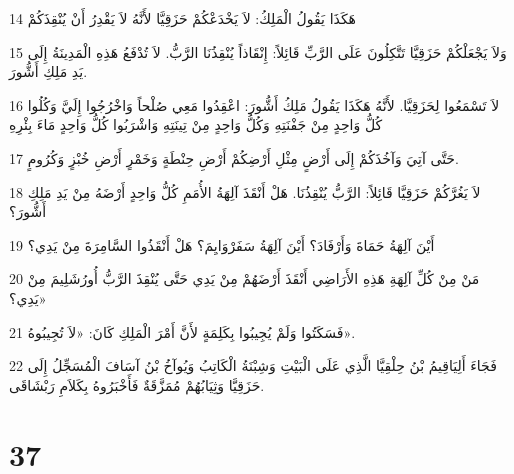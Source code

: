 \par 14 هَكَذَا يَقُولُ الْمَلِكُ: لاَ يَخْدَعْكُمْ حَزَقِيَّا لأَنَّهُ لاَ يَقْدِرُ أَنْ يُنْقِذَكُمْ
\par 15 وَلاَ يَجْعَلْكُمْ حَزَقِيَّا تَتَّكِلُونَ عَلَى الرَّبِّ قَائِلاً: إِنْقَاذاً يُنْقِذُنَا الرَّبُّ. لاَ تُدْفَعُ هَذِهِ الْمَدِينَةُ إِلَى يَدِ مَلِكِ أَشُّورَ.
\par 16 لاَ تَسْمَعُوا لِحَزَقِيَّا. لأَنَّهُ هَكَذَا يَقُولُ مَلِكُ أَشُّورَ: اعْقِدُوا مَعِي صُلْحاً وَاخْرُجُوا إِلَيَّ وَكُلُوا كُلُّ وَاحِدٍ مِنْ جَفْنَتِهِ وَكُلُّ وَاحِدٍ مِنْ تِينَتِهِ وَاشْرَبُوا كُلُّ وَاحِدٍ مَاءَ بِئْرِهِ
\par 17 حَتَّى آتِيَ وَآخُذَكُمْ إِلَى أَرْضٍ مِثْلِ أَرْضِكُمْ أَرْضِ حِنْطَةٍ وَخَمْرٍ أَرْضِ خُبْزٍ وَكُرُومٍ.
\par 18 لاَ يَغُرَّكُمْ حَزَقِيَّا قَائِلاً: الرَّبُّ يُنْقِذُنَا. هَلْ أَنْقَذَ آلِهَةُ الأُمَمِ كُلُّ وَاحِدٍ أَرْضَهُ مِنْ يَدِ مَلِكِ أَشُّورَ؟
\par 19 أَيْنَ آلِهَةُ حَمَاةَ وَأَرْفَادَ؟ أَيْنَ آلِهَةُ سَفَرْوَايِمَ؟ هَلْ أَنْقَذُوا السَّامِرَةَ مِنْ يَدِي؟
\par 20 مَنْ مِنْ كُلِّ آلِهَةِ هَذِهِ الأَرَاضِي أَنْقَذَ أَرْضَهُمْ مِنْ يَدِي حَتَّى يُنْقِذَ الرَّبُّ أُورُشَلِيمَ مِنْ يَدِي؟»
\par 21 فَسَكَتُوا وَلَمْ يُجِيبُوا بِكَلِمَةٍ لأَنَّ أَمْرَ الْمَلِكِ كَانَ: «لاَ تُجِيبُوهُ».
\par 22 فَجَاءَ أَلِيَاقِيمُ بْنُ حِلْقِيَّا الَّذِي عَلَى الْبَيْتِ وَشِبْنَةُ الْكَاتِبُ وَيُوآخُ بْنُ آسَافَ الْمُسَجِّلُ إِلَى حَزَقِيَّا وَثِيَابُهُمْ مُمَزَّقَةٌ فَأَخْبَرُوهُ بِكَلاَمِ رَبْشَاقَى.

\chapter{37}

